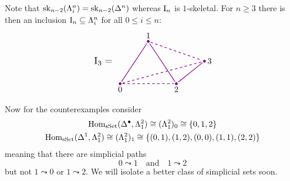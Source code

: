         Note that $\operatorname{sk}_{n-2}(\Lambda^{n}_{i}) = \operatorname{sk}_{n-2}(\Delta^n)$ whereas $\mathrm{I}_n$ is $1$-skeletal. For $n \geq 3$ there is then an inclusion $\mathrm{I}_n \subseteq \Lambda^{n}_{i}$ for all $0 \leq i \leq n$:
        \begin{equation*}
            \begin{tikzpicture}[
                scale=1.2, 
                thick, 
                color=violet, %
                every node/.style={text=black},
                dot/.style={circle, fill=violet, inner sep=1.2pt, outer sep=0pt},
                edge/.style={shorten <=3pt, shorten >=3pt}
            ]

                \coordinate (v0) at (0,0);
                \coordinate (v1) at (1,1.5);
                \coordinate (v2) at (2,0);
                \coordinate (v3) at (3,0.8);

                \node[scale=1.2] at (-0.6, 0.8) {$\mathrm{I}_3 =$};

                \draw[dashed, edge] (v0) -- (v2);
                \draw[dashed, edge] (v0) -- (v3);
                \draw[dashed, edge] (v1) -- (v3);

                \draw[edge] (v0) -- (v1);
                \draw[edge] (v1) -- (v2);
                \draw[edge] (v2) -- (v3);

                \node[dot] at (v0) {};
                \node[dot] at (v1) {};
                \node[dot] at (v2) {};
                \node[dot] at (v3) {};

                \node[below] at (v0) {0};
                \node[above] at (v1) {1};
                \node[below] at (v2) {2};
                \node[right] at (v3) {3};

            \end{tikzpicture}
        \end{equation*} 
        Now for the counterexamples consider
        \begin{gather*}
            \operatorname{Hom}_{\operatorname{sSet}}(\Delta^{\bullet}, \Lambda^{2}_{1}) \cong (\Lambda^{2}_{1})_0 \cong \left\{ 0, 1, 2 \right\} \\
            \operatorname{Hom}_{\operatorname{sSet}}(\Delta^1, \Lambda^{2}_{1}) \cong (\Lambda^{2}_{1})_1 \cong \left\{ (0,1), (1,2), (0,0), (1,1), (2,2) \right\}
        \end{gather*}
        meaning that there are simplicial paths
        \begin{equation*}
            0 \leadsto 1 \quad \text{and} \quad 1 \leadsto 2
        \end{equation*}
        but not $1 \leadsto 0$ or $1 \leadsto 2$. We will isolate a better class of simplicial sets soon.
        \smallskip

